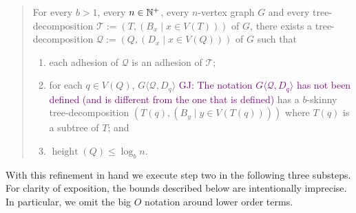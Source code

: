 \documentclass{patmorin}
\renewcommand{\le}{\leqslant}
\newcommand{\gwen}[1]{\noindent\textcolor{Purple}{GJ: #1}}
\newcommand{\torso}[2]{{#1}\langle{#2}\rangle}
\DeclareMathOperator{\height}{height}
\begin{document}
  \begin{quote}
    For every $b>1$, every $n\in\mathbb{N}^+$, every $n$-vertex graph $G$ and every tree-decomposition $\mathcal{T}:=(T,(B_x\mid x\in V(T)))$ of $G$, there exists a tree-decomposition $\mathcal{Q}:=(Q,(D_x\mid x\in V(Q)))$ of $G$ such that
    \begin{enumerate}[nosep,nolistsep,label=\rm(\roman*)]
      \item
      each adhesion of $\mathcal{Q}$ is an adhesion of $\mathcal{T}$;
      \item for each $q\in V(Q)$, $\torso{G}{\mathcal{Q},D_q}$ \gwen{The notation $\torso{G}{\mathcal{Q},D_q}$ has not been defined (and is different from the one that is defined)} has a $b$-skinny tree-decomposition $(T(q), (B_y\mid y\in V(T(q))))$ where $T(q)$ is a subtree of $T$; and
      \item $\height(Q)\le \log_b n$.
    \end{enumerate}
  \end{quote}

With this refinement in hand we execute step two in the following three substeps. For clarity of exposition, the bounds described below are intentionally imprecise. In particular, we omit the big $O$ notation around lower order terms. 
\end{document}
